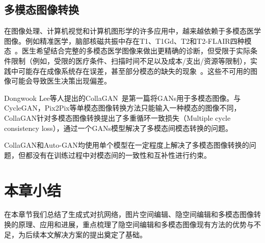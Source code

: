 \subsection{多模态图像转换}

在图像处理、计算机视觉和计算机图形学的许多应用中，越来越依赖于多模态医学图像。例如精准医学，脑部核磁共振中存在T1、T1Gd、T2和T2-FLAIR四种模态~\cite{drevelegas2011imaging}。医生希望结合完整的多模态医学图像来做出更精确的诊断，但受限于实际条件限制（例如，受限的医疗条件、扫描时间不足以及成本/支出/资源等限制），实践中可能存在成像系统存在误差，甚至部分模态的缺失的现象~\cite{tanenbaum2017synthetic}。这些不可用的图像可能会导致医生决策出现偏差。

Dongwook Lee等人提出的CollaGAN~\cite{collagan}是第一篇将GANs用于多模态图像。与CycleGAN，Pix2Pix等单模态图像转换方法只能输入一种模态的图像不同，CollaGAN针对多模态图像转换提出了多重循环一致损失（Multiple cycle consistency loss），通过一个GANs模型解决了多模态间模态转换的问题。

CollaGAN和Auto-GAN均使用单个模型在一定程度上解决了多模态图像转换的问题，但都没有在训练过程中对模态间的一致性和互补性进行约束。

\section{本章小结}

在本章节我们总结了生成式对抗网络，图片空间编辑、隐空间编辑和多模态图像转换的原理、应用和进展，重点梳理了隐空间编辑和多模态图像现有方法的优势与不足，为后续本文解决方案的提出奠定了基础。
